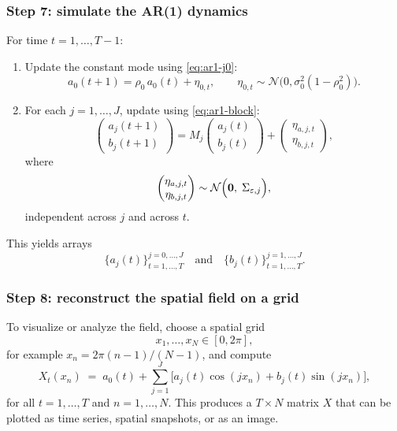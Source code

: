 \documentclass[answers,12pt,addpoints]{exam}
\begin{document}
\subsubsection*{Step 7: simulate the AR(1) dynamics}

For time $t = 1,\dots,T-1$:

\begin{enumerate}
  \item Update the constant mode using \eqref{eq:ar1-j0}:
    \[
      a_0(t+1) = \rho_0\, a_0(t) + \eta_{0,t},
      \qquad \eta_{0,t} \sim \mathcal{N}\bigl(0, \sigma_0^2 (1 - \rho_0^2)\bigr).
    \]

  \item For each $j = 1,\dots,J$, update using \eqref{eq:ar1-block}:
    \[
      \begin{pmatrix} a_j(t+1) \\ b_j(t+1) \end{pmatrix}
      =
      M_j
      \begin{pmatrix} a_j(t) \\ b_j(t) \end{pmatrix}
      +
      \begin{pmatrix} \eta_{a,j,t} \\ \eta_{b,j,t} \end{pmatrix},
    \]
    where
    \[
      \begin{pmatrix} \eta_{a,j,t} \\ \eta_{b,j,t} \end{pmatrix}
      \sim
      \mathcal{N}\Bigl(\mathbf{0},\; \Sigma_{\varepsilon,j}\Bigr),
    \]
    independent across $j$ and across $t$.
\end{enumerate}

This yields arrays
\[
  \{a_j(t)\}_{t=1,\dots,T}^{j=0,\dots,J}
  \quad\text{and}\quad
  \{b_j(t)\}_{t=1,\dots,T}^{j=1,\dots,J}.
\]

\subsubsection*{Step 8: reconstruct the spatial field on a grid}

To visualize or analyze the field, choose a spatial grid
\[
  x_1,\dots,x_N \in [0,2\pi],
\]
for example $x_n = 2\pi (n-1)/(N-1)$, and compute
\[
  X_t(x_n)
  \;=\;
  a_0(t) + \sum_{j=1}^{J} \bigl[ a_j(t)\cos(j x_n) + b_j(t)\sin(j x_n) \bigr],
\]
for all $t=1,\dots,T$ and $n=1,\dots,N$. This produces a $T \times N$ matrix $X$ that can be plotted as time series, spatial snapshots, or as an image.
\end{document}
